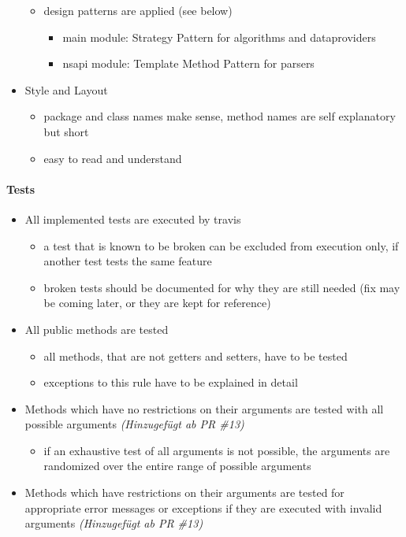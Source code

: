 \documentclass[accentcolor=tud0b,12pt,paper=a4]{tudreport}
\begin{document}
\begin{itemize}
\begin{itemize}
	\item design patterns are applied (see below)
		\begin{itemize}
		\item main module: Strategy Pattern for algorithms and dataproviders
		\item nsapi module: Template Method Pattern for parsers
		\end{itemize}
	\end{itemize}
\item Style and Layout
	\begin{itemize}
	\item package and class names make sense, method names are self explanatory but short
	\item easy to read and understand
	\end{itemize}
\end{itemize}

\paragraph{Tests}
\begin{itemize}
\item All implemented tests are executed by travis
	\begin{itemize}
	\item a test that is known to be broken can be excluded from execution only, if another test tests the same feature
	\item broken tests should be documented for why they are still needed (fix may be coming later, or they are kept for reference)
	\end{itemize}
\item All public methods are tested
	\begin{itemize}
	\item all methods, that are not getters and setters, have to be tested
	\item exceptions to this rule have to be explained in detail
	\end{itemize}
\item Methods which have no restrictions on their arguments are tested with all possible arguments \textit{(Hinzugefügt ab PR \#13)}
	\begin{itemize}
	\item if an exhaustive test of all arguments is not possible, the arguments are randomized over the entire range of possible arguments
	\end{itemize}
\item Methods which have restrictions on their arguments are tested for appropriate error messages or exceptions if they are executed with invalid arguments \textit{(Hinzugefügt ab PR \#13)}
\end{itemize}
\end{document}
